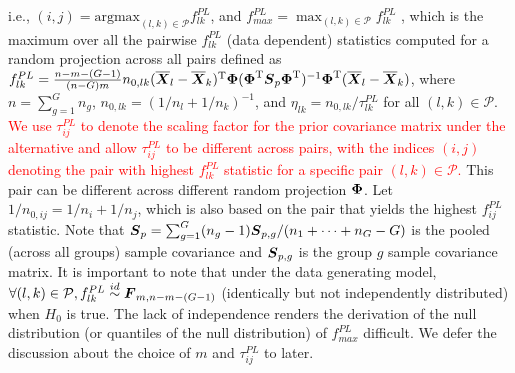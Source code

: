 \documentclass[times,sort&compress,3p]{elsarticle}
\theoremstyle{plain}%
\theoremstyle{definition}
\def\trans{^{\rm T}}
\newcommand{\uF}       {\mbox{\boldmath$F$}}
\newcommand{\uS}       {\mbox{\boldmath$S$}}
\newcommand{\uX}       {\mbox{\boldmath$X$}}
\newcommand{\uPhi}              {\mbox{\boldmath$\Phi$}}
\begin{document}
i.e., 
 {\color{red}
$(i, j) = {\mathrm{argmax}}_{(l, k)\in\mathcal{P}}f_{lk}^{PL}$, and
$f^{PL}_{max} = \max_{(l, k)\in\mathcal{P}} f^{PL}_{lk}$
 }
, which is the maximum over all the pairwise $f^{PL}_{lk}$ (data dependent) statistics computed for a random projection across all pairs defined as 
$f^{PL}_{lk} = \frac{n-m-(G-1)}{(n-G)m} n_{0,lk} (\overline{\uX}_l - \overline{\uX}_k)\trans\uPhi(\uPhi\trans\uS_{p}\uPhi\trans)^{-1}\uPhi\trans(\overline{\uX}_l - \overline{\uX}_k)$, where $n = \sum^{G}_{g=1}n_g$, $n_{0,lk} = (1/n_l + 1/n_k)^{-1}$, and $\eta_{lk} = n_{0,lk}/\tau^{PL}_{lk}$ for all $(l, k)\in\mathcal{P}$.
\textcolor{red}{
 We use $\tau^{PL}_{ij}$ to denote the scaling factor for the prior covariance matrix under the alternative and allow $\tau^{PL}_{ij}$ to be different across pairs, with the indices $(i,j)$ denoting the pair with highest $f^{PL}_{lk}$ statistic for a specific pair
 $(l, k)\in\mathcal{P}$.
}
 This pair can be different across different random projection $\uPhi$. Let %
 $1/n_{0,ij} = 1/n_i + 1/n_j$, which is also based on the pair that yields the highest $f^{PL}_{ij}$ statistic. Note that $\uS_p = \sum^{G}_{g=1} (n_g - 1)\uS_{p,g}/(n_1+\cdots +n_{G} - G)$ is the pooled (across all groups) sample covariance and $\uS_{p,g}$ is the group $g$ sample covariance matrix. It is important to note that under the data generating model, $\forall(l,k) \in \mathcal{P}, f^{PL}_{lk} \stackrel{id}{\sim} \uF_{m, n - m- (G-1)}$ (identically but not independently distributed) when $H_{0}$ is true. The lack of independence renders the derivation of the null distribution (or quantiles of the null distribution) of $f^{PL}_{max}$ difficult. We defer the discussion about the choice of $m$ and $\tau^{PL}_{ij}$ to later. %
\end{document}
